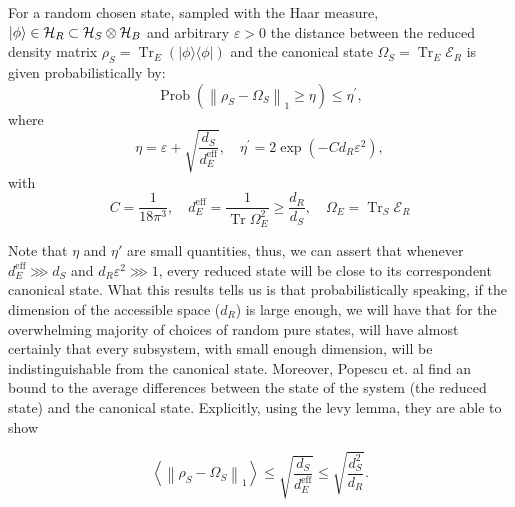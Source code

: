 \begin{theorem}
For a random chosen state, sampled with the Haar measure, $\mathinner{|{\phi}\rangle}\in\mathcal{H}_R\subset\mathcal{H}_S\otimes\mathcal{H}_B$ and arbitrary $\varepsilon >0$ the distance between the reduced density matrix $\rho_{S}=\operatorname{Tr}_{E}(|\phi\rangle\langle\phi|)$ and the canonical state $\Omega_S=\operatorname{Tr}_E\mathcal{E}_R$ is given probabilistically by:
\begin{equation}
\operatorname{Prob}\left(\left\|\rho_{S}-\Omega_{S}\right\|_{1} \geq \eta\right) \leq \eta^{\prime},
\label{CH1:Typicality_result_1}
\end{equation}
where
\begin{equation}
\eta=\varepsilon+\sqrt{\frac{d_{S}}{d_{E}^{\mathrm{eff}}}}, \quad \eta^{\prime}=2 \exp \left(-C d_{R} \varepsilon^{2}\right),
\label{CH1:Typicality_result_1_1}
\end{equation}
with
\begin{equation}
C=\frac{1}{18 \pi^{3}}, \quad d_{E}^{\mathrm{eff}}=\frac{1}{\operatorname{Tr} \Omega_{E}^{2}}\geq \frac{d_R}{d_S}, \quad \Omega_{E}=\operatorname{Tr}_{S} \mathcal{E}_{R}
\label{CH1:Typicality_result_1_2}
\end{equation}
\end{theorem}

Note that $\eta$ and $\eta'$ are small quantities, thus, we can assert that whenever $d^{\mathrm{eff}}_E\ggg d_S$ and $d_R\varepsilon^2\ggg 1$, every reduced state will be close to its correspondent canonical state. What this results tells us is that probabilistically speaking, if the dimension of the accessible space ($d_R$) is large enough, we will have that for the overwhelming majority of choices of random pure states, will have almost certainly that every subsystem, with small enough dimension, will be indistinguishable from the canonical state. Moreover, Popescu et. al \cite{popescu_entanglement_2006} find an bound to the average differences between the state of the system (the reduced state) and the canonical state. Explicitly, using the levy lemma, they are able to show 

\begin{equation}
\left\langle\left\|\rho_{S}-\Omega_{S}\right\|_{1}\right\rangle \leq \sqrt{\frac{d_S}{d_E^{\mathrm{eff}}}}\leq\sqrt{\frac{d_{S}^{2}}{d_{R}}}.
\label{CH1:Typicality_result_2}
\end{equation}

